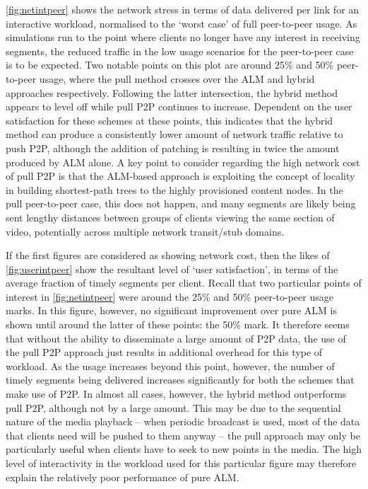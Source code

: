 \autoref{fig:netintpeer} shows the network stress in terms of data delivered per link for an interactive workload, normalised to the `worst case' of full peer-to-peer usage. As simulations run to the point where clients no longer have any interest in receiving segments, the reduced traffic in the low usage scenarios for the peer-to-peer case is to be expected. Two notable points on this plot are around 25\% and 50\% peer-to-peer usage, where the pull method crosses over the ALM and hybrid approaches respectively. Following the latter intersection, the hybrid method appears to level off while pull P2P continues to increase. Dependent on the user satisfaction for these schemes at these points, this indicates that the hybrid method can produce a consistently lower amount of network traffic relative to push P2P, although the addition of patching is resulting in twice the amount produced by ALM alone. A key point to consider regarding the high network cost of pull P2P is that the ALM-based approach is exploiting the concept of locality in building shortest-path trees to the highly provisioned content nodes. In the pull peer-to-peer case, this does not happen, and many segments are likely being sent lengthy distances between groups of clients viewing the same section of video, potentially across multiple network transit/stub domains.

If the first figures are considered as showing network cost, then the likes of \autoref{fig:userintpeer} show the resultant level of `user satisfaction', in terms of the average fraction of timely segments per client. Recall that two particular points of interest in \autoref{fig:netintpeer} were around the 25\% and 50\% peer-to-peer usage marks. In this figure, however, no significant improvement over pure ALM is shown until around the latter of these points: the 50\% mark. It therefore seems that without the ability to disseminate a large amount of P2P data, the use of the pull P2P approach just results in additional overhead for this type of workload. As the usage increases beyond this point, however, the number of timely segments being delivered increases significantly for both the schemes that make use of P2P. In almost all cases, however, the hybrid method outperforms pull P2P, although not by a large amount. This may be due to the sequential nature of the media playback -- when periodic broadcast is used, most of the data that clients need will be pushed to them anyway -- the pull approach may only be particularly useful when clients have to seek to new points in the media. The high level of interactivity in the workload used for this particular figure may therefore explain the relatively poor performance of pure ALM.

